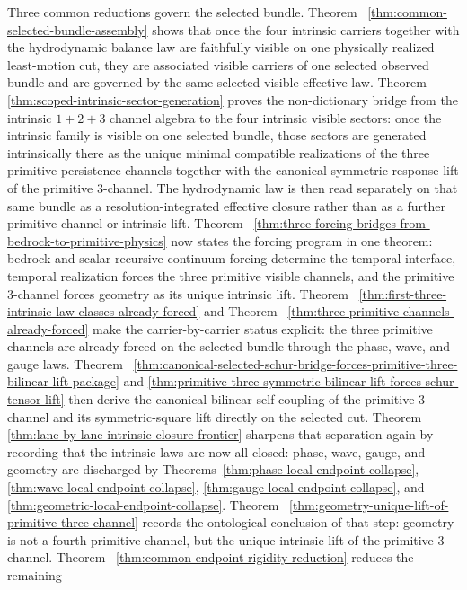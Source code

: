 Three common reductions govern the selected bundle. Theorem~
\ref{thm:common-selected-bundle-assembly} shows that once the four intrinsic
carriers together with the hydrodynamic balance law are faithfully
visible on one physically realized least-motion cut, they are associated
visible carriers of one selected observed bundle and are governed by the same
selected visible effective law. Theorem~
\ref{thm:scoped-intrinsic-sector-generation} proves the non-dictionary bridge
from the intrinsic \(1+2+3\) channel algebra to the four intrinsic visible
sectors: once the intrinsic family is visible on one selected bundle,
those sectors are generated intrinsically there as the unique minimal
compatible realizations of the three primitive persistence channels together
with the canonical symmetric-response lift of the primitive \(3\)-channel.
The hydrodynamic law is then read separately on that same bundle as a
resolution-integrated effective closure rather than as a further primitive
channel or intrinsic lift. Theorem~
\ref{thm:three-forcing-bridges-from-bedrock-to-primitive-physics} now states
the forcing program in one theorem: bedrock and scalar-recursive continuum
forcing determine the temporal interface, temporal realization forces the three
primitive visible channels, and the primitive \(3\)-channel forces geometry as
its unique intrinsic lift. Theorem~
\ref{thm:first-three-intrinsic-law-classes-already-forced} and Theorem~
\ref{thm:three-primitive-channels-already-forced} make the carrier-by-carrier status
explicit: the three primitive channels are already forced on the selected
bundle through the phase, wave, and gauge laws. Theorem~
\ref{thm:canonical-selected-schur-bridge-forces-primitive-three-bilinear-lift-package}
and
\ref{thm:primitive-three-symmetric-bilinear-lift-forces-schur-tensor-lift}
then derive the canonical bilinear self-coupling of the primitive
\(3\)-channel and its symmetric-square lift directly on the selected cut.
Theorem~
\ref{thm:lane-by-lane-intrinsic-closure-frontier} sharpens that separation
again by recording that the intrinsic laws are now all closed: phase,
wave, gauge, and geometry are discharged by
Theorems~\ref{thm:phase-local-endpoint-collapse},
\ref{thm:wave-local-endpoint-collapse},
\ref{thm:gauge-local-endpoint-collapse}, and
\ref{thm:geometric-local-endpoint-collapse}. Theorem~
\ref{thm:geometry-unique-lift-of-primitive-three-channel} records the
ontological conclusion of that step: geometry is not a fourth primitive
channel, but the unique intrinsic lift of the primitive \(3\)-channel. Theorem~
\ref{thm:common-endpoint-rigidity-reduction} reduces the remaining
